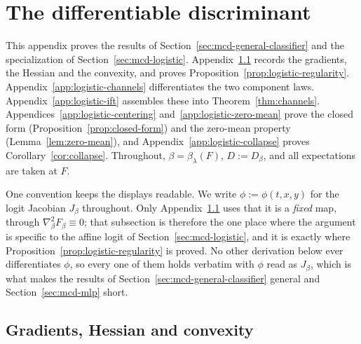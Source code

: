 \documentclass[11pt]{article}
\theoremstyle{plain}
\theoremstyle{definition}
\theoremstyle{remark}
\begin{document}
\section{The differentiable discriminant}
\label{app:logistic}

This appendix proves the results of Section~\ref{sec:mcd-general-classifier} and the
specialization of Section~\ref{sec:mcd-logistic}.
Appendix~\ref{app:logistic-grads} records the gradients, the Hessian and the convexity, and
proves Proposition~\ref{prop:logistic-regularity}.
Appendix~\ref{app:logistic-channels} differentiates the two component laws.
Appendix~\ref{app:logistic-ift} assembles these into Theorem~\ref{thm:channels}.
Appendices~\ref{app:logistic-centering} and~\ref{app:logistic-zero-mean} prove the closed form
(Proposition~\ref{prop:closed-form}) and the zero-mean property (Lemma~\ref{lem:zero-mean}), and
Appendix~\ref{app:logistic-collapse} proves Corollary~\ref{cor:collapse}. Throughout,
$\beta = \beta_\lambda(F)$, $D := D_\beta$, and all expectations are taken at $F$.

One convention keeps the displays readable. We write $\phi := \phi(t,x,y)$ for the logit
Jacobian $J_\beta$ throughout. Only Appendix~\ref{app:logistic-grads} uses that it is a
\emph{fixed} map, through $\nabla^2_\beta F_\beta \equiv 0$; that subsection is therefore the
one place where the argument is specific to the affine logit of
Section~\ref{sec:mcd-logistic}, and it is exactly where
Proposition~\ref{prop:logistic-regularity} is proved. No other derivation below ever
differentiates $\phi$, so every one of them holds verbatim with $\phi$ read as
$J_\beta$, which is what makes the results of Section~\ref{sec:mcd-general-classifier} general
and Section~\ref{sec:mcd-mlp} short.

\subsection{Gradients, Hessian and convexity}
\label{app:logistic-grads}
\end{document}
